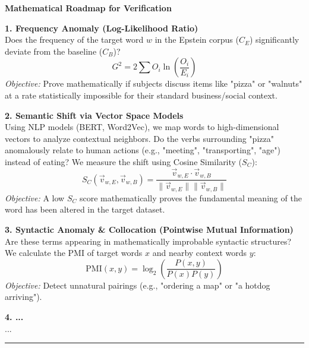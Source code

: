 \documentclass[11pt,a4paper]{article}
\theoremstyle{definition}
\theoremstyle{remark}
\begin{document}
\textbf{Mathematical Roadmap for Verification}

\textbf{1. Frequency Anomaly (Log-Likelihood Ratio)}\\
Does the frequency of the target word $w$ in the Epstein corpus ($C_E$) significantly deviate from the baseline ($C_B$)?
$$ G^2 = 2 \sum O_i \ln\left(\frac{O_i}{E_i}\right) $$
\textit{Objective:} Prove mathematically if subjects discuss items like "pizza" or "walnuts" at a rate statistically impossible for their standard business/social context.

\textbf{2. Semantic Shift via Vector Space Models}\\
Using NLP models (BERT, Word2Vec), we map words to high-dimensional vectors to analyze contextual neighbors. Do the verbs surrounding "pizza" anomalously relate to human actions (e.g., "meeting", "transporting", "age") instead of eating? We measure the shift using Cosine Similarity ($S_C$):
$$ S_C(\vec{v}_{w, E}, \vec{v}_{w, B}) = \frac{\vec{v}_{w, E} \cdot \vec{v}_{w, B}}{\|\vec{v}_{w, E}\| \|\vec{v}_{w, B}\|} $$
\textit{Objective:} A low $S_C$ score mathematically proves the fundamental meaning of the word has been altered in the target dataset.

\textbf{3. Syntactic Anomaly \& Collocation (Pointwise Mutual Information)}\\
Are these terms appearing in mathematically improbable syntactic structures? We calculate the PMI of target words $x$ and nearby context words $y$:
$$ \text{PMI}(x, y) = \log_2 \left( \frac{P(x, y)}{P(x)P(y)} \right) $$
\textit{Objective:} Detect unnatural pairings (e.g., "ordering a map" or "a hotdog arriving").

\textbf{4. ...}\\
...

\vspace{0.5cm}
\hrule
\vspace{0.5cm}

\end{document}
